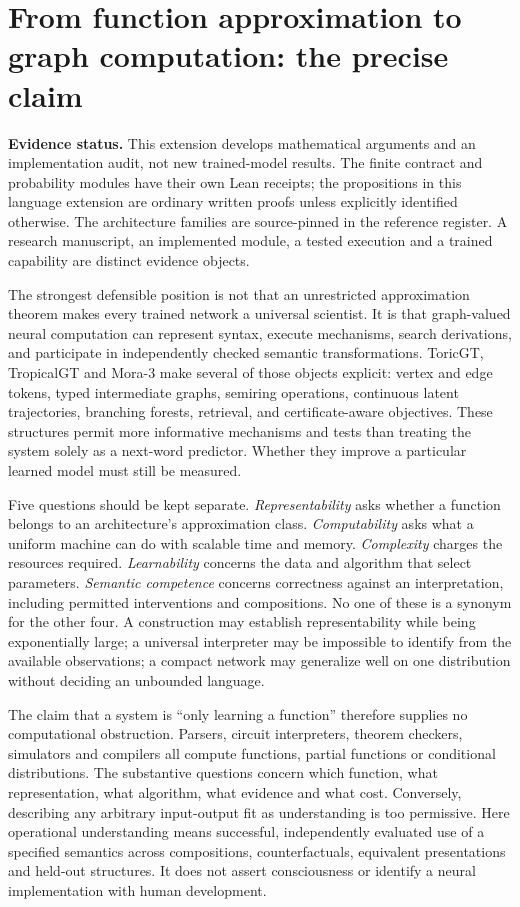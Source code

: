 \section{From function approximation to graph computation: the precise claim}
\label{sec:wb-language-expressivity}

\noindent\textbf{Evidence status.} This extension develops mathematical arguments and an implementation audit, not new trained-model results. The finite contract and probability modules have their own Lean receipts; the propositions in this language extension are ordinary written proofs unless explicitly identified otherwise. The architecture families are source-pinned in the reference register. A research manuscript, an implemented module, a tested execution and a trained capability are distinct evidence objects.

The strongest defensible position is not that an unrestricted approximation theorem makes every trained network a universal scientist. It is that graph-valued neural computation can represent syntax, execute mechanisms, search derivations, and participate in independently checked semantic transformations. ToricGT, TropicalGT and Mora-3 make several of those objects explicit: vertex and edge tokens, typed intermediate graphs, semiring operations, continuous latent trajectories, branching forests, retrieval, and certificate-aware objectives. These structures permit more informative mechanisms and tests than treating the system solely as a next-word predictor. Whether they improve a particular learned model must still be measured.

Five questions should be kept separate. \emph{Representability} asks whether a function belongs to an architecture's approximation class. \emph{Computability} asks what a uniform machine can do with scalable time and memory. \emph{Complexity} charges the resources required. \emph{Learnability} concerns the data and algorithm that select parameters. \emph{Semantic competence} concerns correctness against an interpretation, including permitted interventions and compositions. No one of these is a synonym for the other four. A construction may establish representability while being exponentially large; a universal interpreter may be impossible to identify from the available observations; a compact network may generalize well on one distribution without deciding an unbounded language.

The claim that a system is ``only learning a function'' therefore supplies no computational obstruction. Parsers, circuit interpreters, theorem checkers, simulators and compilers all compute functions, partial functions or conditional distributions. The substantive questions concern which function, what representation, what algorithm, what evidence and what cost. Conversely, describing any arbitrary input-output fit as understanding is too permissive. Here operational understanding means successful, independently evaluated use of a specified semantics across compositions, counterfactuals, equivalent presentations and held-out structures. It does not assert consciousness or identify a neural implementation with human development.

